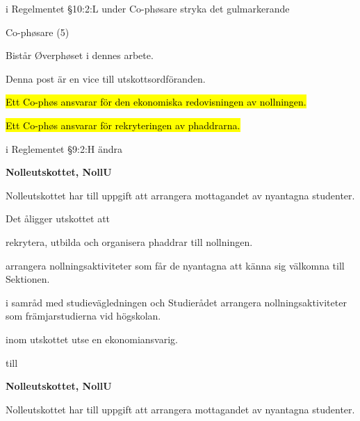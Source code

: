 \documentclass[../_main/handlingar.tex]{subfiles}
\begin{document}
\begin{attsatser}

    \att i Regelmentet \S10:2:L under Co-phøsare stryka det gulmarkerande

    \begin{emptylist}
        \item Co-phøsare (5)
        \begin{dashlist}
            \item Bistår Øverphøset i dennes arbete.
            \item Denna post är en vice till utskottsordföranden.
            \item \hl{Ett Co-phøs ansvarar för den ekonomiska redovisningen av nollningen.}
            \item \hl{Ett Co-phøs ansvarar för rekryteringen av phaddrarna.}
        \end{dashlist}
        \changenote
    \end{emptylist}


    \att i Reglementet \S9:2:H ändra 

    \begin{emptylist}
        \item {\large\textbf{Nolleutskottet, NollU}}

        \item Nolleutskottet har till uppgift att arrangera mottagandet av nyantagna studenter.
    
        \item Det åligger utskottet att

        \begin{dashlist}
            \item rekrytera, utbilda och organisera phaddrar till nollningen.
            \item arrangera nollningsaktiviteter som får de nyantagna att känna sig välkomna till Sektionen.
            \item i samråd med studievägledningen och Studierådet arrangera nollningsaktiviteter som främjarstudierna vid högskolan.
            \item inom utskottet utse en ekonomiansvarig.
        \end{dashlist}
    \end{emptylist}

    till 

    
    \begin{emptylist}
        \item {\large\textbf{Nolleutskottet, NollU}}
        \item Nolleutskottet har till uppgift att arrangera mottagandet av nyantagna studenter.
        

\end{emptylist}
\end{attsatser}
\end{document}
